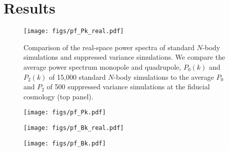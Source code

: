 \section{Results} \label{sec:results} 

\begin{figure}
\begin{center}
    \texttt{[image: figs/pf\_Pk\_real.pdf]} 
    \caption{Comparison of the real-space power spectra of standard $N$-body 
    simulations and suppressed variance simulations. We compare the average 
    power spectrum monopole and quadrupole, $P_0(k)$ and $P_2(k)$ of 15,000 
    standard $N$-body simulations to the average $P_0$ and $P_2$ of 500 
    suppressed variance simulations at the fiducial cosmology (top panel).
    }
\label{fig:pk_real}
\end{center}
\end{figure}

\begin{figure}
\begin{center}
    \texttt{[image: figs/pf\_Pk.pdf]} 
    \caption{}
\label{fig:pk_rsd}
\end{center}
\end{figure}

\begin{figure}
\begin{center}
    \texttt{[image: figs/pf\_Bk\_real.pdf]} 
    \caption{}
\label{fig:bk_real}
\end{center}
\end{figure}

\begin{figure}
\begin{center}
    \texttt{[image: figs/pf\_Bk.pdf]} 
    \caption{}
\label{fig:bk_real}
\end{center}
\end{figure}
